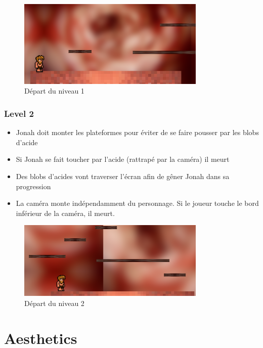 \documentclass{prologArticle}
\begin{document}
\begin{figure}[H]
    \centering
    \includegraphics[width=0.8\textwidth]{res/level1.png}
    \caption{Départ du niveau 1}
\end{figure}

\subsubsection{Level 2}

\begin{itemize}
    \item Jonah doit monter les plateformes pour éviter de se faire pousser par les blobs d'acide
    \item Si Jonah se fait toucher par l'acide (rattrapé par la caméra) il meurt
    \item Des blobs d'acides vont traverser l'écran afin de gêner Jonah dans sa progression
    \item La caméra monte indépendamment du personnage. Si le joueur touche le bord inférieur de la caméra, il meurt.
\end{itemize}

\begin{figure}[H]
    \centering
    \includegraphics[width=0.8\textwidth]{res/level2.png}
    \caption{Départ du niveau 2}
\end{figure}


\section{Aesthetics}
\end{document}
